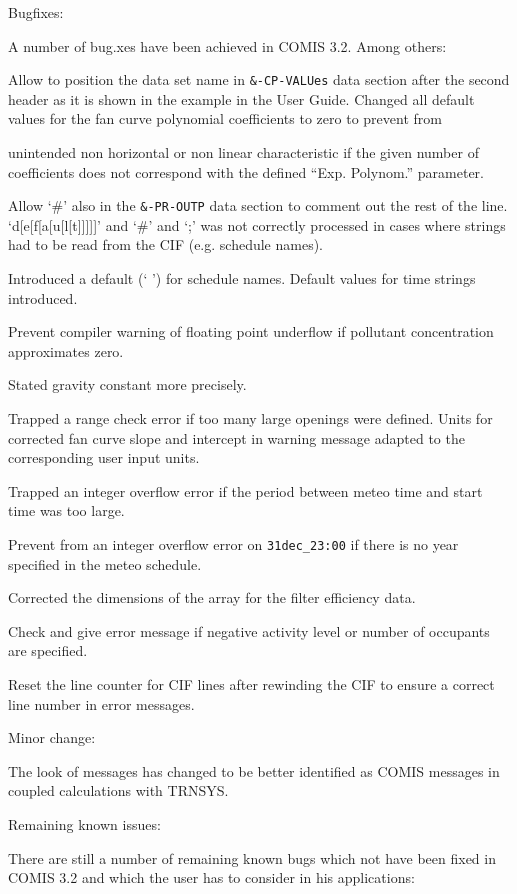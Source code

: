 \documentclass[10pt]{book}
\begin{document}
Bugfixes:

A number of bug.xes have been achieved in COMIS 3.2. Among others:

Allow to position the data set name in \verb|&-CP-VALUes| data section after the second header as it is shown in the example in the User Guide. Changed all default values for the fan curve polynomial coefficients to zero to prevent from

unintended non horizontal or non linear characteristic if the given number of coefficients does not correspond with the defined ``Exp. Polynom.'' parameter.

Allow `\#' also in the \verb|&-PR-OUTP| data section to comment out the rest of the line. `d[e[f[a[u[l[t]]]]]' and `\#' and `;' was not correctly processed in cases where strings had to be read from the CIF (e.g. schedule names).

Introduced a default (` ') for schedule names. 
Default values for time strings introduced. 


Prevent compiler warning of floating point underflow if pollutant concentration approximates zero.
 
Stated gravity constant more precisely. 


Trapped a range check error if too many large openings were defined. 
Units for corrected fan curve slope and intercept in warning message adapted to the corresponding user input units. 


Trapped an integer overflow error if the period between meteo time and start time was too large.
 
Prevent from an integer overflow error on \verb|31dec_23:00| if there is no year specified in the meteo schedule. 

Corrected the dimensions of the array for the filter efficiency data. 

Check and give error message if negative activity level or number of occupants are specified. 

Reset the line counter for CIF lines after rewinding the CIF to ensure a correct line number in error messages. 


Minor change:

The look of messages has changed to be better identified as COMIS messages in coupled calculations with TRNSYS. 

Remaining known issues:

There are still a number of remaining known bugs which not have been fixed in COMIS 3.2 and which the user has to consider in his applications:
\end{document}
